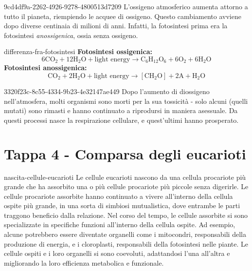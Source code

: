 \documentclass[preview]{standalone}
\begin{document}
\begin{snippet}{9cd4df9a-2262-4926-9278-4800513d7209}
    L'ossigeno atmosferico aumenta attorno a tutto il pianeta, riempiendo le acquee
    di ossigeno.
    Questo cambiamento avviene dopo diverse centinaia di milioni di anni.
    Infatti, la fotosintesi prima era la fotosintesi
    \textit{anossigenica}, ossia senza ossigeno.
\end{snippet}

\begin{snippet}{differenza-fra-fotosintesi}
    \textbf{Fotosintesi ossigenica:}
    \[ 6\text{CO}_2 + 12\text{H}_2\text{O} + \text{light energy} \longrightarrow \text{C}_6\text{H}_12\text{O}_6 + 6\text{O}_2 + 6\text{H}_2\text{O} \]
    \textbf{Fotosintesi anossigenica:}
    \[ \text{CO}_2 + 2\text{H}_2\text{O} + \text{light energy} \longrightarrow [\text{CH}_2\text{O}] + 2\text{A} + \text{H}_2\text{O} \]
\end{snippet}

\begin{snippet}{3320f23c-8c55-4334-9b23-4e32147ae449}
    Dopo l'aumento di diossigeno nell'atmosfera, molti organismi sono morti
    per la sua tossicità - solo alcuni (quelli mutati) sono rimasti e hanno continuato a riprodursi in
    maniera asessuale. Da questi processi nasce la respirazione cellulare, e
    quest'ultimi hanno prosperato.
\end{snippet}

\section{Tappa 4 - Comparsa degli eucarioti}

\begin{snippet}{nascita-cellule-eucarioti}
    Le cellule eucarioti nascono da una cellula procariote
    più grande che ha assorbito una o più cellule procariote più piccole senza digerirle.
    Le cellule procariote assorbite hanno continuato a vivere all'interno della cellula ospite più grande, in una sorta di simbiosi mutualistica, dove entrambe le parti traggono beneficio dalla relazione.
    Nel corso del tempo, le cellule assorbite si sono specializzate in specifiche funzioni all'interno della cellula ospite. Ad esempio, alcune potrebbero essere diventate organelli come i mitocondri, responsabili della produzione di energia, e i cloroplasti, responsabili della fotosintesi nelle piante.
    Le cellule ospiti e i loro organelli si sono coevoluti, adattandosi l'una all'altra e migliorando la loro efficienza metabolica e funzionale.
\end{snippet}
\end{document}
